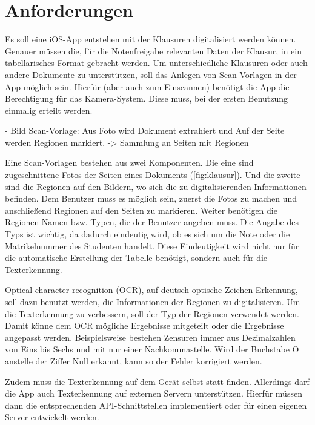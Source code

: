 \documentclass[nomenclature, oneside, 150]{HSMW-Thesis}
\begin{document}
\chapter{Anforderungen}\label{ch:anforderungen}
	Es soll eine iOS-App entstehen mit der Klausuren digitalisiert werden können. Genauer müssen die, für die Notenfreigabe relevanten Daten der Klausur, in ein tabellarisches Format gebracht werden. Um unterschiedliche Klausuren oder auch andere Dokumente zu unterstützen, soll das Anlegen von Scan-Vorlagen in der App möglich sein. Hierfür (aber auch zum Einscannen) benötigt die App die Berechtigung für das Kamera-System. Diese muss, bei der ersten Benutzung einmalig erteilt werden.
	
	- Bild Scan-Vorlage: Aus Foto wird Dokument extrahiert und Auf der Seite werden Regionen markiert. -> Sammlung an Seiten mit Regionen
	
	Eine Scan-Vorlagen bestehen aus zwei Komponenten. Die eine sind zugeschnittene Fotos der Seiten eines Dokuments (\ref{fig:klausur}). Und die zweite sind die Regionen auf den Bildern, wo sich die zu digitalisierenden Informationen befinden. Dem Benutzer muss es möglich sein, zuerst die Fotos zu machen und anschließend Regionen auf den Seiten zu markieren. Weiter benötigen die Regionen Namen bzw. Typen, die der Benutzer angeben muss. Die Angabe des Typs ist wichtig, da dadurch eindeutig wird, ob es sich um die Note oder die Matrikelnummer des Studenten handelt. Diese Eindeutigkeit wird nicht nur für die automatische Erstellung der Tabelle benötigt, sondern auch für die Texterkennung. 
	
	Optical character recognition (OCR), auf deutsch optische Zeichen Erkennung, soll dazu benutzt werden, die Informationen der Regionen zu digitalisieren. Um die Texterkennung zu verbessern, soll der Typ der Regionen verwendet werden. Damit könne dem OCR mögliche Ergebnisse mitgeteilt oder die Ergebnisse angepasst werden. Beispielsweise bestehen Zensuren immer aus Dezimalzahlen von Eins bis Sechs und mit nur einer Nachkommastelle. Wird der Buchstabe O anstelle der Ziffer Null erkannt, kann so der Fehler korrigiert werden.
	
	Zudem muss die Texterkennung auf dem Gerät selbst statt finden. Allerdings darf die App auch Texterkennung auf externen Servern unterstützen. Hierfür müssen dann die entsprechenden API-Schnittstellen implementiert oder für einen eigenen Server entwickelt werden.
\end{document}
